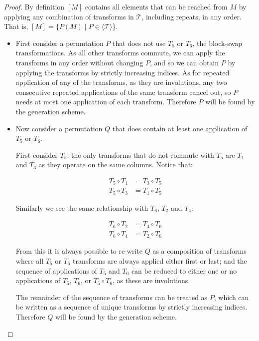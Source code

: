 \documentclass{article}
\begin{document}
\begin{proof}
By definition $[M]$ contains all elements that can be reached from $M$ by
applying any combination of transforms in $\mathcal{T}$,
including repeats, in any order.
That is, $[M] = \{P(M) \; | \; P \in \langle\mathcal{T}\rangle$\}.


\begin{itemize}
  \item First consider a permutation $P$ that does not use $T_5$ or $T_6$, the
  block-swap transformations.
  As all other transforms commute, we can apply the transforms in any order
  without changing $P$, and so we can obtain $P$ by applying the transforms by
  strictly increasing indices.
  As for repeated application of any of the transforms, as they are involutions,
  any two consecutive repeated applications of the same transform cancel out, so
  $P$ needs at most one application of each transform.
  Therefore $P$ will be found by the generation scheme.

  \item Now consider a permutation $Q$ that does contain at least one
  application of $T_5$ or $T_6$.

  First consider $T_5$: the only transforms that do not commute with $T_5$ are
  $T_1$ and $T_3$ as they operate on the same columns.
  Notice that:

  \begin{align*}
  T_5 \circ T_1 &= T_3 \circ T_5 \\
  T_5 \circ T_3 &= T_1 \circ T_5
  \end{align*}

  Similarly we see the same relationship with $T_6$, $T_2$ and $T_4$:
  
  \begin{align*}
  T_6 \circ T_2 &= T_4 \circ T_6 \\
  T_6 \circ T_4 &= T_2 \circ T_6
  \end{align*}

  From this it is always possible to re-write $Q$ as a composition of transforms
  where all $T_5$ or $T_6$ transforms are always applied either first or last;
  and the sequence of applications of $T_5$ and $T_6$ can be reduced to either
  one or no applications of $T_5$, $T_6$, or $T_5 \circ T_6$, as these are
  involutions.

  The remainder of the sequence of transforms can be treated as $P$, which can
  be written as a sequence of unique transforms by strictly increasing indices.
  Therefore $Q$ will be found by the generation scheme.
\end{itemize}
\end{proof}
\end{document}
